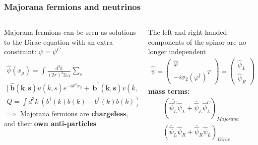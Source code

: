 \documentclass{beamer}
\begin{document}
	\begin{frame}
		\frametitle{Majorana fermions and neutrinos}
		\begin{columns}[c] %
			
			\begin{column}{.45\textwidth} %
			{\footnotesize Majorana fermions can be seen as solutions to the Dirac equation with an extra constraint:
			$\psi = \psi^C$				
			}
			
			{\tiny
			\begin{eqnarray*}
			\hat{\psi}(x_{\mu}) = \int \frac{d^3 \overline{k}}{(2\pi)^3 2 \omega_k} \sum_s & \\
			\bigg[\ \boldsymbol{\hat{b}(\overline{k},s)}u(\overline{k},s)e^{-ik^{\mu}x_{\mu}}
			 + \ \boldsymbol{\hat{b}^{\dagger}(\overline{k},s)}v(\overline{k},s)e^{+ik^{\mu}x_{\mu}} \bigg] & \\
			 Q = \int d^3k \  \left(b^{\dagger}(k)b(k) - b^{\dagger}(k)b(k)\right) = 0
			\end{eqnarray*}
			}
			{\footnotesize $\implies$ Majorana fermions are \textbf{chargeless}, and their \textbf{own anti-particles}}
			\end{column}
			\hspace{25pt}
			\vrule{}
			\hspace{15pt}
			\begin{column}{.5\textwidth} %
			{\footnotesize The left and right handed components of the spinor are no longer independent}
			\begin{eqnarray*}
			\hat{\psi} = \begin{pmatrix}
			\hat{\varphi} \\
			-i\sigma_2(\varphi^{\dagger})^T
			\end{pmatrix} =  \begin{pmatrix}
			\hat{\psi}_L \\
			\hat{\psi}_R
			\end{pmatrix}
			\end{eqnarray*}
			{\footnotesize \textbf{mass terms:}}
			\begin{eqnarray*}
			\left( \overline{\hat{\psi}^C_L} \hat{\psi}_L + \overline{\hat{\psi}}_L \hat{\psi}^C_L \right)_{Majorana} \\
			 \left(\overline{\hat{\psi}}_L \hat{\psi}_R + \overline{\hat{\psi}}_R \hat{\psi}_L\right)_{Dirac}
			\end{eqnarray*}
			\end{column}
		\end{columns}
	\end{frame}	
	
\end{document}
